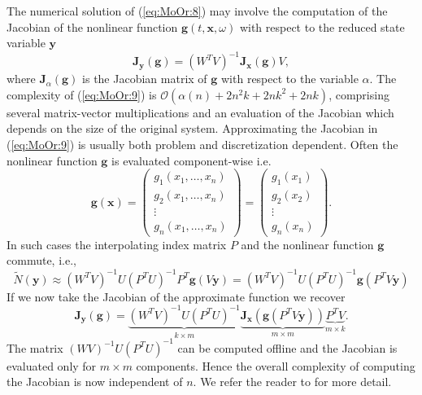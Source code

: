 The numerical solution of (\ref{eq:MoOr:8}) may involve the computation of the Jacobian of the nonlinear function $\mathbf g(t,\mathbf x, \omega)$ with respect to the reduced state variable $\mathbf y$
\begin{equation} \label{eq:MoOr:9}
	\mathbf J_{\mathbf y}(\mathbf g) = (W^TV)^{-1} \mathbf J_{\mathbf x}(\mathbf g) V,
\end{equation}
where $\mathbf J_\alpha(\mathbf g)$ is the Jacobian matrix of $\mathbf g$ with respect to the variable $\alpha$. The complexity of (\ref{eq:MoOr:9}) is $\mathcal{O}(\alpha(n) +2n^2k+2nk^2+2nk)$, comprising several matrix-vector multiplications and an evaluation of the Jacobian which depends on the size of the original system. Approximating the Jacobian in (\ref{eq:MoOr:9}) is usually both problem and discretization dependent. Often the nonlinear function $\mathbf g$ is evaluated component-wise i.e.
\begin{equation} \label{eq:MoOr:15}
	\mathbf g(\mathbf x) =
	\begin{pmatrix}
		g_1(x_1,\dots,x_n) \\
		g_2(x_1,\dots,x_n) \\
		\vdots \\
		g_n(x_1,\dots,x_n)
	\end{pmatrix}
	=
	\begin{pmatrix}
		g_1(x_1) \\
		g_2(x_2) \\
		\vdots \\
		g_n(x_n)
	\end{pmatrix}.
\end{equation}
In such cases the interpolating index matrix $P$ and the nonlinear function $\mathbf g$ commute, i.e.,
\begin{equation} \label{eq:MoOr:16}
	\tilde N(\mathbf y) \approx (W^TV)^{-1} U(P^TU)^{-1}P^T \mathbf g(V\mathbf y) = (W^TV)^{-1} U(P^TU)^{-1}\mathbf g(P^TV\mathbf y)
\end{equation}
If we now take the Jacobian of the approximate function we recover
\begin{equation}
	\mathbf J_{\mathbf y}(\mathbf g) = \underbrace{ (W^TV)^{-1} U(P^TU)^{-1} }_{k\times m} \underbrace{ \mathbf J_{\mathbf x}(\mathbf g(P^T V \mathbf y) ) }_{m\times m} \underbrace{P^T V}_{m\times k}.
\end{equation}
The matrix $(WV)^{-1} U(P^TU)^{-1}$ can be computed offline and the Jacobian is evaluated only for $m\times m$ components. Hence the overall complexity of computing the Jacobian is now independent of $n$. We refer the reader to \cite{Barrault:2004kz,Chaturantabut:2010cz} for more detail.
